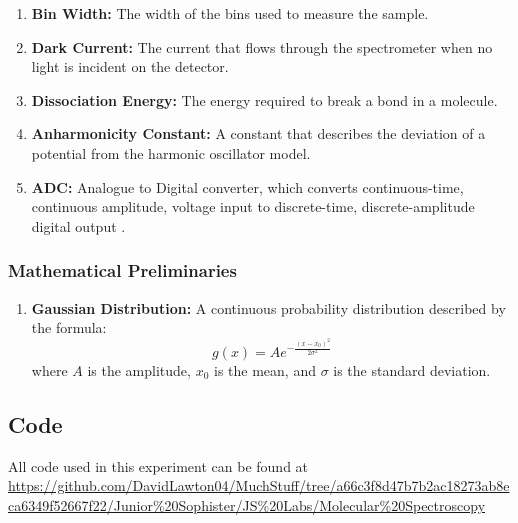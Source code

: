 \documentclass{article}
\begin{document}
\begin{enumerate}
    \item \label{kew:binwidth}\textbf{Bin Width:} The width of the bins used to measure the sample.
    
    \item \label{kew: DarkCurrent}\textbf{Dark Current:} The current that flows through the spectrometer when no light is incident on the detector.
    
    \item \textbf{Dissociation Energy:} The energy required to break a bond in a molecule.
    
    \item \textbf{Anharmonicity Constant:} A constant that describes the deviation of a potential from the harmonic oscillator model.
    
    \item \label{kew: ADC}\textbf{ADC:} Analogue to Digital converter, which converts continuous-time, continuous amplitude, voltage input to discrete-time, discrete-amplitude digital output \cite{enwiki:1248045950}.
    
\end{enumerate}
\subsubsection{Mathematical Preliminaries}
\begin{enumerate}
    \item \textbf{Gaussian Distribution:} A continuous probability distribution described by the formula:
    \begin{equation}
        g(x) = Ae^{-\frac{(x-x_0)^2}{2\sigma^2}}
    \end{equation}
    where $A$ is the amplitude, $x_0$ is the mean, and $\sigma$ is the standard deviation.
\end{enumerate}
\subsection{Code}\label{sec:code}
All code used in this experiment can be found at \url{https://github.com/DavidLawton04/MuchStuff/tree/a66c3f8d47b7b2ac18273ab8eca6349f52667f22/Junior%20Sophister/JS%20Labs/Molecular%20Spectroscopy}






\end{document}
